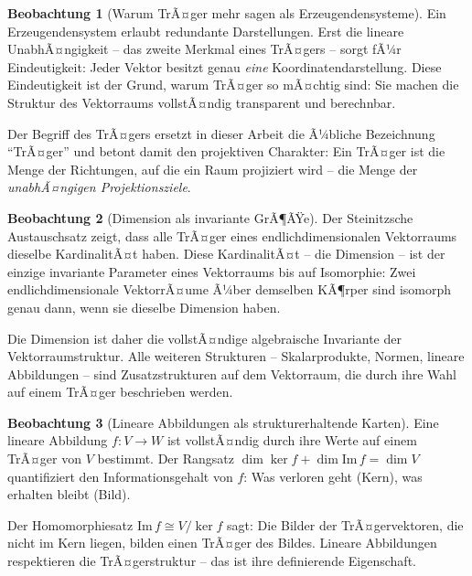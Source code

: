 ﻿\documentclass[a4paper,12pt]{report}
\theoremstyle{definition}
\newtheorem{beobachtung}{Beobachtung}
\begin{document}
\begin{beobachtung}[Warum TrÃ¤ger mehr sagen als Erzeugendensysteme]
    Ein Erzeugendensystem erlaubt redundante Darstellungen. Erst die
    lineare UnabhÃ¤ngigkeit -- das zweite Merkmal eines TrÃ¤gers -- sorgt
    fÃ¼r Eindeutigkeit: Jeder Vektor besitzt genau \emph{eine}
    Koordinatendarstellung. Diese Eindeutigkeit ist der Grund, warum
    TrÃ¤ger so mÃ¤chtig sind: Sie machen die Struktur des Vektorraums
    vollstÃ¤ndig transparent und berechnbar.

    Der Begriff des TrÃ¤gers ersetzt in dieser Arbeit die Ã¼bliche
    Bezeichnung ``TrÃ¤ger'' und betont damit den projektiven Charakter:
    Ein TrÃ¤ger ist die Menge der Richtungen, auf die ein Raum projiziert
    wird -- die Menge der \emph{unabhÃ¤ngigen Projektionsziele}.
\end{beobachtung}

\begin{beobachtung}[Dimension als invariante GrÃ¶ÃŸe]
    Der Steinitzsche Austauschsatz zeigt, dass alle TrÃ¤ger eines
    endlichdimensionalen Vektorraums dieselbe KardinalitÃ¤t haben.
    Diese KardinalitÃ¤t -- die Dimension -- ist der einzige invariante
    Parameter eines Vektorraums bis auf Isomorphie:
    Zwei endlichdimensionale VektorrÃ¤ume Ã¼ber demselben KÃ¶rper sind
    isomorph genau dann, wenn sie dieselbe Dimension haben.

    Die Dimension ist daher die vollstÃ¤ndige algebraische Invariante
    der Vektorraumstruktur. Alle weiteren Strukturen -- Skalarprodukte,
    Normen, lineare Abbildungen -- sind Zusatzstrukturen auf dem
    Vektorraum, die durch ihre Wahl auf einem TrÃ¤ger beschrieben werden.
\end{beobachtung}

\begin{beobachtung}[Lineare Abbildungen als strukturerhaltende Karten]
    Eine lineare Abbildung $f : V \to W$ ist vollstÃ¤ndig durch ihre
    Werte auf einem TrÃ¤ger von $V$ bestimmt. Der Rangsatz
    $\dim\ker f + \dim\mathrm{Im}\,f = \dim V$ quantifiziert den
    Informationsgehalt von $f$: Was verloren geht (Kern), was
    erhalten bleibt (Bild).

    Der Homomorphiesatz $\mathrm{Im}\,f \cong V/\ker f$ sagt:
    Die Bilder der TrÃ¤gervektoren, die nicht im Kern liegen, bilden
    einen TrÃ¤ger des Bildes. Lineare Abbildungen respektieren die
    TrÃ¤gerstruktur -- das ist ihre definierende Eigenschaft.
\end{beobachtung}
\end{document}
